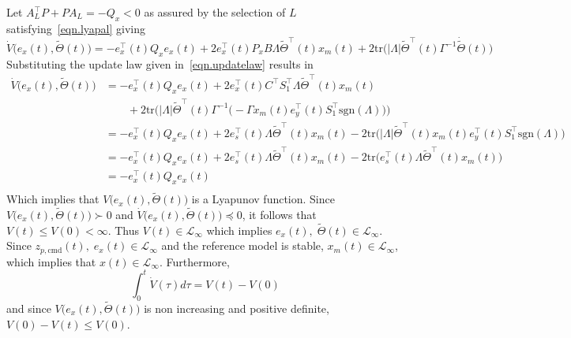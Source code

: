 \begin{proof-dan}
  Let $A_{L}^{\top}P+PA_{L}=-Q_{x}<0$ as assured by the selection of $L$ satisfying\ \eqref{eqn.lyapal} giving
  \begin{equation*}
    \dot{V}\bigr(e_{x}(t),\widetilde{\Theta}(t)\bigr)
    =
    -e_{x}^{\top}(t)Q_{x}e_{x}(t) + 2e_{x}^{\top}(t)P_{x}B\Lambda\widetilde{\Theta}^{\top}(t)x_{m}(t)+2\text{tr}\bigr(|\Lambda|\widetilde{\Theta}^{\top}(t)\Gamma^{-1}\dot{\widetilde{\Theta}}(t)\bigr)
  \end{equation*}
  Substituting the update law given in\ \eqref{eqn.updatelaw} results in
  \begin{equation*}
    \begin{split}
      \dot{V}\bigr(e_{x}(t),\widetilde{\Theta}(t)\bigr)
      &=
      -e_{x}^{\top}(t)Q_{x}e_{x}(t) + 2e_{x}^{\top}(t)C^{\top}S_{1}^{\top}\Lambda\widetilde{\Theta}^{\top}(t)x_{m}(t) \\
      & \qquad + 2\text{tr}\bigr(|\Lambda|\widetilde{\Theta}^{\top}(t)\Gamma^{-1}\bigr(-\Gamma x_{m}(t)e_{y}^{\top}(t)S_{1}^{\top}\text{sgn}(\Lambda)\bigr)\bigr) \\
      &=
      -e_{x}^{\top}(t)Q_{x}e_{x}(t) + 2e_{s}^{\top}(t)\Lambda\widetilde{\Theta}^{\top}(t)x_{m}(t) - 2\text{tr}\bigr(|\Lambda|\widetilde{\Theta}^{\top}(t)x_{m}(t)e_{y}^{\top}(t)S_{1}^{\top}\text{sgn}(\Lambda)\bigr) \\
      &=
      -e_{x}^{\top}(t)Q_{x}e_{x}(t) + 2e_{s}^{\top}(t)\Lambda\widetilde{\Theta}^{\top}(t)x_{m}(t) - 2\text{tr}\bigr(e_{s}^{\top}(t)\Lambda\widetilde{\Theta}^{\top}(t)x_{m}(t)\bigr) \\
      &=
      -e_{x}^{\top}(t)Q_{x}e_{x}(t) \\
    \end{split}
  \end{equation*}
  Which implies that $V\bigr(e_{x}(t),\widetilde{\Theta}(t)\bigr)$ is a Lyapunov function.
  Since $V\bigr(e_{x}(t),\widetilde{\Theta}(t)\bigr)\succ0$ and $\dot{V}\bigr(e_{x}(t),\widetilde{\Theta}(t)\bigr)\preceq0$, it follows that $V(t)\leq V(0)<\infty$.
  Thus $V(t)\in\mathcal{L}_{\infty}$ which implies $e_{x}(t), \; \widetilde{\Theta}(t)\in\mathcal{L}_{\infty}$.
  Since $z_{p,\text{cmd}}(t),\;e_{x}(t)\in\mathcal{L}_{\infty}$ and the reference model is stable, $x_{m}(t)\in\mathcal{L}_{\infty}$, which implies that $x(t)\in\mathcal{L}_{\infty}$.
  Furthermore,
  \begin{equation*}
    \int_{0}^{t}\dot{V}(\tau)d\tau=V(t)-V(0)
  \end{equation*}
  and since $V\bigr(e_{x}(t),\widetilde{\Theta}(t)\bigr)$ is non increasing and positive definite, $V(0)-V(t)\leq V(0)$.

\end{proof-dan}
